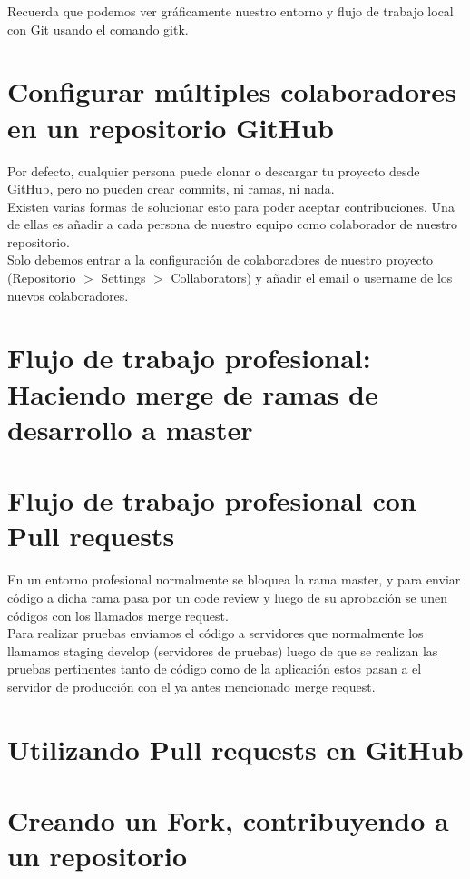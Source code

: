 \documentclass{article}
\begin{document}
Recuerda que podemos ver gráficamente nuestro entorno y flujo de trabajo local
con Git usando el comando gitk.

\section{Configurar múltiples colaboradores en un repositorio GitHub}%
Por defecto, cualquier persona puede clonar o descargar tu proyecto desde
GitHub, pero no pueden crear commits, ni ramas, ni nada.\\

Existen varias formas de solucionar esto para poder aceptar contribuciones. Una
de ellas es añadir a cada persona de nuestro equipo como colaborador de nuestro
repositorio.\\

Solo debemos entrar a la configuración de colaboradores de nuestro proyecto
(Repositorio $>$ Settings $>$ Collaborators) y añadir el email o username de los
nuevos colaboradores.\\

\section{Flujo de trabajo profesional: Haciendo merge de ramas de desarrollo a master}%

\section{Flujo de trabajo profesional con Pull requests}%
En un entorno profesional normalmente se bloquea la rama master, y para enviar
código a dicha rama pasa por un code review y luego de su aprobación se unen
códigos con los llamados merge request.\\

Para realizar pruebas enviamos el código a servidores que normalmente los
llamamos staging develop (servidores de pruebas) luego de que se realizan las
pruebas pertinentes tanto de código como de la aplicación estos pasan a el
servidor de producción con el ya antes mencionado merge request.\\

\section{Utilizando Pull requests en GitHub}%

\section{Creando un Fork, contribuyendo a un repositorio}%
\end{document}
